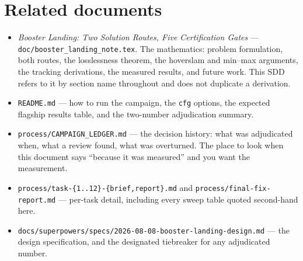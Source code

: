 \documentclass[11pt]{article}
\newcommand{\thenote}{\emph{Booster Landing: Two Solution Routes, Five
Certification Gates}}
\newcommand{\file}[1]{\texttt{#1}}
\begin{document}
\section*{Related documents}

\begin{itemize}
\item \thenote{} --- \file{doc/booster\_landing\_note.tex}. The
mathematics: problem formulation, both routes, the losslessness theorem, the
hoverslam and min--max arguments, the tracking derivations, the measured
results, and future work. This SDD refers to it by section name throughout
and does not duplicate a derivation.
\item \file{README.md} --- how to run the campaign, the \texttt{cfg}
options, the expected flagship results table, and the two-number
adjudication summary.
\item \file{process/CAMPAIGN\_LEDGER.md} --- the decision history: what was
adjudicated when, what a review found, what was overturned. The place to
look when this document says ``because it was measured'' and you want the
measurement.
\item \file{process/task-\{1..12\}-\{brief,report\}.md} and
\file{process/final-fix-report.md} --- per-task detail, including every
sweep table quoted second-hand here.
\item \file{docs/superpowers/specs/2026-08-08-booster-landing-design.md}
--- the design specification, and the designated tiebreaker for any
adjudicated number.
\end{itemize}
\end{document}
